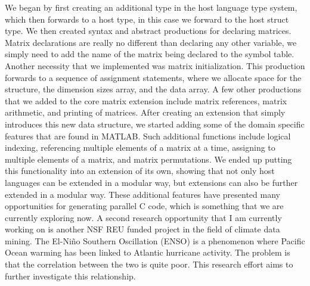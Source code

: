 \documentclass[a4paper,12pt]{article}
\newcommand{\tab}{\hspace*{2em}}
\begin{document}
\tab We began by first creating an additional type in the host language type system, which then forwards to a host type, in this case we forward to the host struct type.  We then created syntax and abstract productions for declaring matrices.  Matrix declarations are really no different than declaring any other variable, we simply need to add the name of the matrix being declared to the symbol table.  Another necessity that we implemented was matrix initialization.  This production forwards to a sequence of assignment statements, where we allocate space for the structure, the dimension sizes array, and the data array.  A few other productions that we added to the core matrix extension include matrix references, matrix arithmetic, and printing of matrices.  \newline
\tab After creating an extension that simply introduces this new data structure, we started adding some of the domain specific features that are found in MATLAB.  Such additional functions include logical indexing, referencing multiple elements of a matrix at a time, assigning to multiple elements of a matrix, and matrix permutations.  We ended up putting this functionality into an extension of its own, showing that not only host languages can be extended in a modular way, but extensions can also be further extended in a modular way.  These additional features have presented many opportunities for generating parallel C code, which is something that we are currently exploring now.\newline
\tab A second research opportunity that I am currently working on is another NSF REU funded project in the field of climate data mining.  The El-Ni\~{n}o Southern Oscillation (ENSO) is a phenomenon where Pacific Ocean warming has been linked to Atlantic hurricane activity\cite{enso}.  The problem is that the correlation between the two is quite poor.  This research effort aims to further investigate this relationship.  \newline
\end{document}
